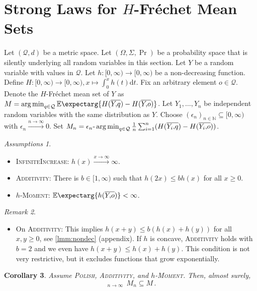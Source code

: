 \documentclass{scrartcl}
\renewcommand{\subset}{\subseteq}
\newcommand{\Ex}{\E\expectarg}
\newcommand*{\mc}[1]{\mathcal{#1}}
\newcommand{\N}{\mathbb{N}}
\newcommand{\dl}{\mathrm{d}}
\newcommand{\equationFullstop}{\, .}
\newcommand{\eqfs}{\equationFullstop}
\DeclareMathOperator*{\argmin}{arg\,min}
\DeclareMathOperator*{\outerlim}{lim\, \overline{sup}}
\theoremstyle{plain}\newtheorem{theorem}{Theorem}[section]
\newtheorem{corollary}[theorem]{Corollary}
\theoremstyle{definition}
\theoremstyle{remark}
\newtheorem{remark}[theorem]{Remark}
\newtheorem{assumptions}[theorem]{Assumptions}
\begin{document}
 \section{Strong Laws for $H$-Fréchet Mean Sets}\label{sec:nondec}
Let $(\mc Q, d)$ be a metric space. Let $(\Omega, \Sigma, \Pr)$ be a probability space that is silently underlying all random variables in this section. Let $Y$ be a random variable with values in $\mc Q$.
Let $h \colon [0,\infty) \to [0,\infty)$ be a non-decreasing function.
Define $H \colon [0,\infty) \to [0,\infty), x\mapsto \int_0^x h(t) \dl t$.
Fix an arbitrary element $o\in\mc Q$. Denote the $H$-Fréchet mean set of $Y$ as $M = \argmin_{q\in\mc Q} \Ex{H(\ol Yq) - H(\ol Yo)}$.
Let $Y_1, \dots, Y_n$ be independent random variables with the same distribution as $Y$.
Choose $(\epsilon_n)_{n\in\N}\subset [0,\infty)$ with $\epsilon_n \xrightarrow{n\to\infty}0$. Set $M_n = \epsilon_n\text{-}\argmin_{q\in\mc Q} \frac1n \sum_{i=1}^n (H(\ol {Y_i}q) - H(\ol {Y_i}o))$.
\begin{assumptions}\mbox{ }
	\begin{itemize}
	\item \textsc{InfiniteIncrease}:
		$h(x) \xrightarrow{x\to\infty} \infty$.
	\item \textsc{Additivity}:
		There is $b \in [1,\infty)$ such that $h(2x) \leq b h(x)$ for all $x \geq 0$.
	\item \textsc{$h$-Moment}: 
		$\Ex{h(\ol Yo)} < \infty$.
	\end{itemize}
\end{assumptions}
\begin{remark}\mbox{ }
\begin{itemize}
\item On \textsc{Additivity}:
	This implies $h(x+y)\leq b(h(x) + h(y))$ for all $x,y\geq 0$, see \autoref{lmm:nondec} (appendix).
	If $h$ is concave, \textsc{Additivity} holds with $b=2$ and we even have $h(x+y)\leq h(x) + h(y)$.
	This condition is not very restrictive, but it excludes functions that grow exponentially.
\end{itemize}
\end{remark}
\begin{corollary}\label{cor:nondec:epi}
	Assume \textsc{Polish}, \textsc{Additivity}, and \textsc{$h$-Moment}.
	Then, almost surely, 
	\begin{equation*}
		\outerlim_{n\to\infty}\, M_n \subset M
		\eqfs
	\end{equation*}
\end{corollary}
\end{document}
